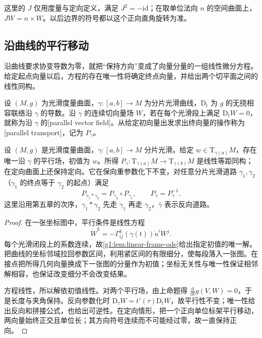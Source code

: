 这里的 \(J\) 仅用度量与定向定义，满足 \(J^2=-\mathrm{id}\)；在取单位法向 \(n\) 的空间曲面上，\(JW=n\times W\)。以后边界的符号都以这个正向直角旋转为准。

\subsection{沿曲线的平行移动}
\label{g1:subsec:0901:02}

沿曲线要求协变导数为零，就把“保持方向”变成了向量分量的一组线性微分方程。给定起点向量以后，方程的存在唯一性将确定终点向量，并给出两个切平面之间的线性同构。

\begin{definition}
	设 \((M,g)\) 为光滑度量曲面，\(\gamma:[a,b]\to M\) 为分片光滑曲线，\(\mathrm D_t\) 为 \(g\) 的无挠相容联络沿 \(\gamma\) 的导数。沿 \(\gamma\) 的连续切向量场 \(W\)，若在每个光滑段上满足 \(\mathrm{D}_tW=0\)，就称为沿 \(\gamma\) 的[parallel vector field]。从给定初向量出发求出终向量的操作称为[parallel transport]，记为 \(P_\gamma\)。
\end{definition}

\begin{theorem}
	\label{g1:thm:surface-parallel-transport}
	设 \((M,g)\) 是光滑度量曲面，\(\gamma:[a,b]\rightarrow M\) 分片光滑。给定 \(w\in \mathrm{T}_{\gamma(a)}M\)，存在唯一沿 \(\gamma\) 的平行场，初值为 \(w\)。所得 \(P_\gamma:\mathrm{T}_{\gamma(a)}M\rightarrow \mathrm{T}_{\gamma(b)}M\) 是线性等距同构；在定向曲面上还保持定向。它在保向重参数化下不变，对任意分片光滑道路 \(\gamma_1,\gamma_2\)（\(\gamma_1\) 的终点等于 \(\gamma_2\) 的起点）满足
	\[
		P_{\gamma_1*\gamma_2}=P_{\gamma_2}\circ P_{\gamma_1},
		\qquad P_{\bar\gamma}=P_\gamma^{-1}.
	\]
	这里沿用第五章的次序，\(\gamma_1*\gamma_2\) 先走 \(\gamma_1\) 再走 \(\gamma_2\)，\(\bar\gamma\) 表示反向道路。
\end{theorem}

\begin{proof}
	在一张坐标图中，平行条件是线性方程
	\[
		\dot W^k=-\Gamma^k_{ij}(\gamma(t))\dot u^iW^j.
	\]
	每个光滑闭段上的系数连续，故\cref{g1:lem:linear-frame-ode}给出指定初值的唯一解。把曲线的坐标邻域拉回参数区间，利用紧区间的有限细分，使每段落入一张图。在接点把所得几何向量换成下一张图的分量作为初值；坐标无关性与唯一性保证相邻解相容，也保证改变细分不会改变结果。

	方程线性，所以解依初值线性。对两个平行场，由上命题得 \(\frac{\mathrm{d}}{\mathrm{d}t}g(V,W)=0\)，于是长度与夹角保持。反向参数化时 \(\mathrm{D}_\tau W=t'(\tau)\mathrm{D}_tW\)，故平行性不变；唯一性给出反向和拼接公式，也给出可逆性。在定向情形，把一个正向单位标架平行移动，两向量始终正交且单位长；其方向符号连续而不可能经过零，故一直保持正向。
\end{proof}


